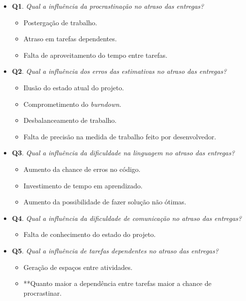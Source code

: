 	\begin{itemize}
	 
	 \item \textbf{Q1}. \textit{Qual a influência da procrastinação no atraso das entregas?}
	 	\begin{itemize}
			\item Postergação de trabalho.
			\item Atraso em tarefas dependentes.
			\item Falta de aproveitamento do tempo entre tarefas.
		\end{itemize}
	  	 
	 \item \textbf{Q2}. \textit{Qual a influência dos erros das estimativas no atraso das entregas?}
	 	\begin{itemize}
			\item Ilusão do estado atual do projeto.
			\item Comprometimento do \textit{burndown}.
			\item Desbalanceamento de trabalho.
			\item Falta de precisão na medida de trabalho feito por desenvolvedor.
		\end{itemize}
	 
	 \item \textbf{Q3}. \textit{Qual a influência da dificuldade na linguagem no atraso das entregas?}
	 	\begin{itemize}
			\item Aumento da chance de erros no código.
			\item Investimento de tempo em aprendizado.
			\item Aumento da possibilidade de fazer solução não ótimas.
		\end{itemize}
	 
	 \item \textbf{Q4}. \textit{Qual a influência da dificuldade de comunicação no atraso das entregas?}
	 	\begin{itemize}
			\item Falta de conhecimento do estado do projeto.
		\end{itemize}
	 
	 \item \textbf{Q5}. \textit{Qual a influência de tarefas dependentes no atraso das entregas?}
	 	\begin{itemize}
			\item Geração de espaços entre atividades.
			\item **Quanto maior a dependência entre tarefas maior a chance de procrastinar.
		\end{itemize}
		   

\end{itemize}
